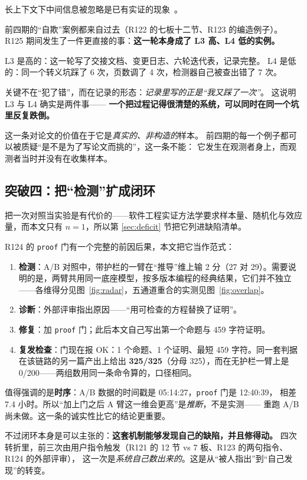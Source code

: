 \documentclass[11pt,a4paper]{article}
\newcommand{\code}[1]{\texttt{#1}}
\begin{document}
长上下文下中间信息被忽略是已有实证的现象~\cite{ref15}。

前四期的“自欺”案例都来自过去（R122 的七板十二节、R123 的编造例子）。
R125 期间发生了一件更直接的事：\textbf{这一轮本身成了 L3 高、L4 低的实例。}

L3 是高的：这一轮写了交接文档、变更日志、六轮迭代表，记录完整。
L4 是低的：同一个转义坑踩了 6 次，页数调了 4 次，检测器自己被查出错了 7 次。

关键不在“犯了错”，而在记录的形态：\emph{记录里写的正是“我又踩了一次”}。
这说明 L3 与 L4 确实是两件事——
\textbf{一个把过程记得很清楚的系统，可以同时在同一个坑里反复跌倒。}

这一条对论文的价值在于它是\emph{真实的、非构造的}样本。
前四期的每一个例子都可以被质疑“是不是为了写论文而挑的”，这一条不能：
它发生在观测者身上，而观测者当时并没有在收集样本。

\subsection{突破四：把“检测”扩成闭环}
把一次对照当实验是有代价的——软件工程实证方法学要求样本量、随机化与效应量\cite{ref24}，而本文只有 $n=1$，所以第 \ref{sec:deficit} 节把它列进缺陷清单。


R124 的 \code{proof} 门有一个完整的前因后果，本文把它当作范式：

\begin{enumerate}[leftmargin=1.8em,itemsep=2pt]
\item \textbf{检测}：A/B 对照中，带护栏的一臂在“推导”维上输 2 分（27 对 29）。需要说明的是，两臂共用同一底座模型，按多版本编程的经典结果\cite{ref3}，它们并不独立——各维得分见图~\ref{fig:radar}，五通道重合的实测见图~\ref{fig:overlap}。
\item \textbf{诊断}：外部评审指出原因——“用可检查的方程替换了证明”。
\item \textbf{修复}：加 \code{proof} 门；此后本文自己写出第一个命题与 459 字符证明。
\item \textbf{复发检查}：门现在报 OK：1 个命题、1 个证明、最短 459 字符。同一套判据在该链路的另一篇产出上给出 \textbf{325/325}（分母 325），而在无护栏一臂上是 0/200——两组数用同一条命令算的，口径相同。
\end{enumerate}

值得强调的是\textbf{时序}：A/B 数据的时间戳是 05:14:27，\code{proof} 门是 12:40:39，
相差 7.4 小时。所以“加上门之后 A 臂这一维会更高”是\emph{推断}，不是实测——
重跑 A/B 尚未做。这一条的诚实性比它的结论更重要。

不过闭环本身是可以主张的：\textbf{这套机制能够发现自己的缺陷，并且修得动。}
四次转折里，前三次由用户指令触发（R121 的 12 节 vs 7 板、R123 的两句指令、R124 的外部评审），
这一次是\emph{系统自己数出来的}。这是从“被人指出”到“自己发现”的转变。
\end{document}
